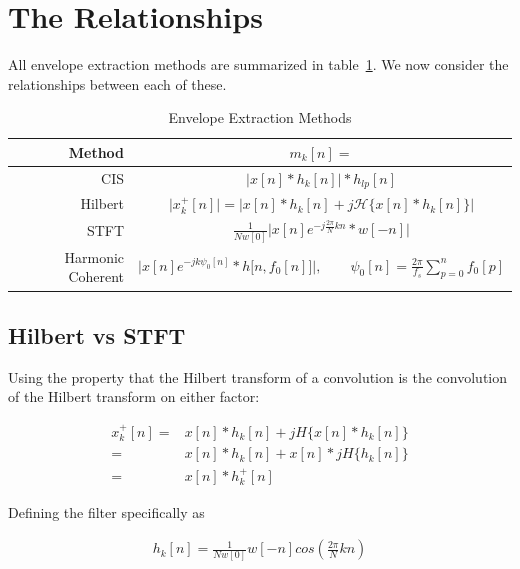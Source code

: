 \documentclass [11pt, proquest,oneside] {ganter_thesis}[2015/03/03]
\begin{document}
\section{The Relationships}

All envelope extraction methods are summarized in table~\ref{table:envelope_extraction_methods}.  We now consider the relationships between each of these.

\begin{table}
\begin{center}
\bgroup
\def\arraystretch{1.7}
\begin{tabular}{| r | c |}
  \hline
  \textbf{Method} & $m_k[n] = $ \\ \hline
  CIS & $\Big| x[n] * h_k[n] \Big| * h_{lp}[n]$ \\ \hline
  Hilbert & $\Big| x^+_k[n] \Big| = \Big| x[n] * h_k[n] + j\mathcal{H}\{x[n] * h_k[n]\} \Big|$ \\ \hline
  STFT & $\frac{1}{Nw[0]}  \Big\vert x[n] e^{-j\frac{2\pi}{N}kn} * w[-n] \Big\vert$ \\ \hline
  Harmonic Coherent & $\Big| x[n] e^{-jk\psi_0 [n]} * h\big[n, f_0[n] \big] \Big|, \qquad \psi_0[n] = \frac{2\pi}{f_s} \sum_{p=0}^{n} f_0[p]$ \\ \hline
\end{tabular}
\egroup
\end{center}
\caption{Envelope Extraction Methods}\label{table:envelope_extraction_methods}
\end{table}

\subsection{Hilbert vs STFT}

Using the property that the Hilbert transform of a convolution is the convolution of the Hilbert transform on either factor:

\begin{align}
\label{eq:x_analytic}
x^+_k[n] =& x[n] * h_k[n] + jH\{x[n] * h_k[n]\} \nonumber \\
=& x[n] * h_k[n] + x[n] * jH\{h_k[n]\} \nonumber \\
=& x[n] * h^+_k[n]
\end{align}

Defining the filter specifically as

\begin{align}
h_k[n] = \frac{1}{Nw[0]}w[-n]cos(\frac{2\pi}{N}kn)
\end{align}
\end{document}
